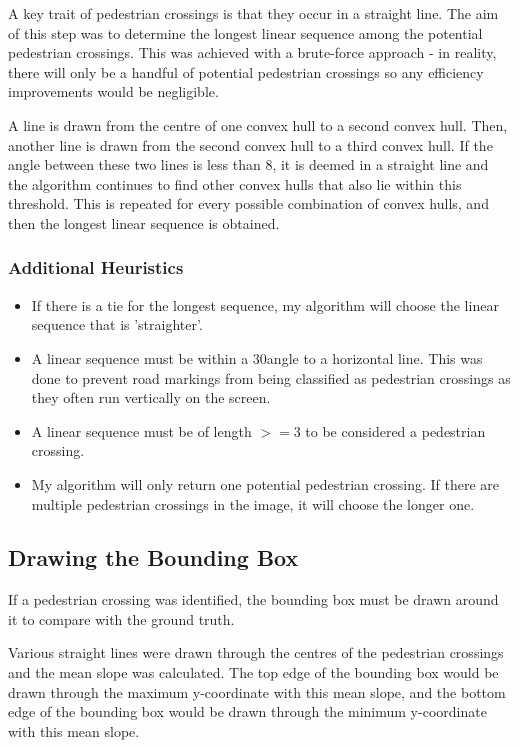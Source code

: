 \documentclass{article}  %
\begin{document}
	A key trait of pedestrian crossings is that they occur in a straight line. The aim of this step was to determine the longest linear sequence among the potential pedestrian crossings. This was achieved with a brute-force approach - in reality, there will only be a handful of potential pedestrian crossings so any efficiency improvements would be negligible.
	
	A line is drawn from the centre of one convex hull to a second convex hull. Then, another line is drawn from the second convex hull to a third convex hull. If the angle between these two lines is less than $8$\textdegree, it is deemed in a straight line and the algorithm continues to find other convex hulls that also lie within this threshold. This is repeated for every possible combination of convex hulls, and then the longest linear sequence is obtained.
	
	\subsubsection*{Additional Heuristics}
	
	\begin{itemize}
		\item If there is a tie for the longest sequence, my algorithm will choose the linear sequence that is 'straighter'.
		\item A linear sequence must be within a $30$\textdegree angle to a horizontal line. This was done to prevent road markings from being classified as pedestrian crossings as they often run vertically on the screen.
		\item A linear sequence must be of length $>= 3$ to be considered a pedestrian crossing.
		\item My algorithm will only return one potential pedestrian crossing. If there are multiple pedestrian crossings in the image, it will choose the longer one.
	\end{itemize}
	
	\subsection{Drawing the Bounding Box}
	
	If a pedestrian crossing was identified, the bounding box must be drawn around it to compare with the ground truth.
	
	Various straight lines were drawn through the centres of the pedestrian crossings and the mean slope was calculated. The top edge of the bounding box would be drawn through the maximum y-coordinate with this mean slope, and the bottom edge of the bounding box would be drawn through the minimum y-coordinate with this mean slope.
	
\end{document}
